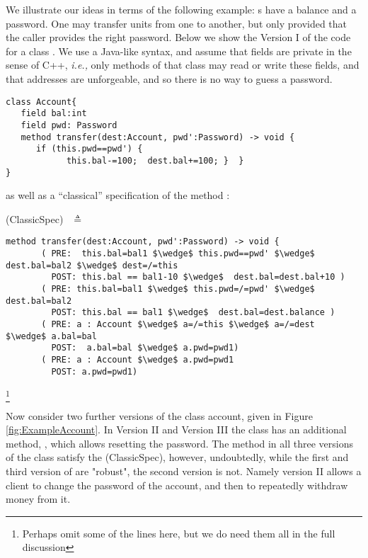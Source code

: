  We illustrate our ideas in terms of the following example:
 s have a balance and a 
password. One may transfer  units from one  to another, but only provided
that  the caller provides the right password. Below we show the Version I of the code for 
a class . 
We use a Java-like syntax,  and assume that fields are private in the sense of C++, \emph{i.e.,}
 only methods of that class may read or write these fields,
 and   that addresses are unforgeable, and so  there is no way to guess a password.

 

\begin{lstlisting}
class Account{
   field bal:int 
   field pwd: Password 
   method transfer(dest:Account, pwd':Password) -> void {
      if (this.pwd==pwd') {
            this.bal-=100;  dest.bal+=100; }  }
}
\end{lstlisting}

as well as a ``classical'' specification of the method :

 (ClassicSpec)$  \ \ $  $\triangleq$

\begin{lstlisting}[mathescape=true, frame=lines]
  method transfer(dest:Account, pwd':Password) -> void {
       ( PRE:  this.bal=bal1 $\wedge$ this.pwd==pwd' $\wedge$ dest.bal=bal2 $\wedge$ dest=/=this 
         POST: this.bal == bal1-10 $\wedge$  dest.bal=dest.bal+10 )
       ( PRE: this.bal=bal1 $\wedge$ this.pwd=/=pwd' $\wedge$ dest.bal=bal2
         POST: this.bal == bal1 $\wedge$  dest.bal=dest.balance )
       ( PRE: a : Account $\wedge$ a=/=this $\wedge$ a=/=dest  $\wedge$ a.bal=bal  
         POST:  a.bal=bal $\wedge$ a.pwd=pwd1)
       ( PRE: a : Account $\wedge$ a.pwd=pwd1  
         POST: a.pwd=pwd1)       
\end{lstlisting}\footnote{Perhaps omit some of the lines here, but we do need them all in the full discussion}
 
  
 
 Now consider two further versions of the class account, given in Figure \ref{fig:ExampleAccount}.
 In Version II and Version III the class has an additional method, , which allows resetting
 the password.
The method  in all three versions of the class  satisfy the (ClassicSpec), 
however, undoubtedly, while the first and third version of  are "robust", the second version is not.
Namely version II allows a client to change the password of the account, and then to repeatedly withdraw 
money from it.
  
